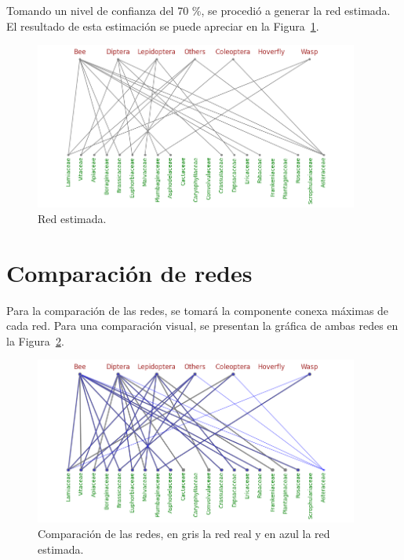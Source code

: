 Tomando un nivel de confianza del 70 \%, se procedió a generar la red estimada. El resultado de esta estimación se puede apreciar en la Figura~\ref{fig:red_estimada}.

\begin{figure}[H]
    \centering
    \includegraphics[width=0.95\textwidth]{Figuras/red_estimada.png}
    \caption{Red estimada.}
    \label{fig:red_estimada}
\end{figure}



\section{Comparación de redes}

Para la comparación de las redes, se tomará la componente conexa máximas de cada red. Para una comparación visual, se presentan la gráfica de ambas redes en la Figura~\ref{fig:redes_comparacion}. 

\begin{figure}[H]
    \centering
    \includegraphics[width=0.95\textwidth]{Figuras/redes_comparacion.png}
    \caption[Comparación de las redes real y estimada.]{Comparación de las redes, en gris la red real y en azul la red estimada.}
    \label{fig:redes_comparacion}
\end{figure}

